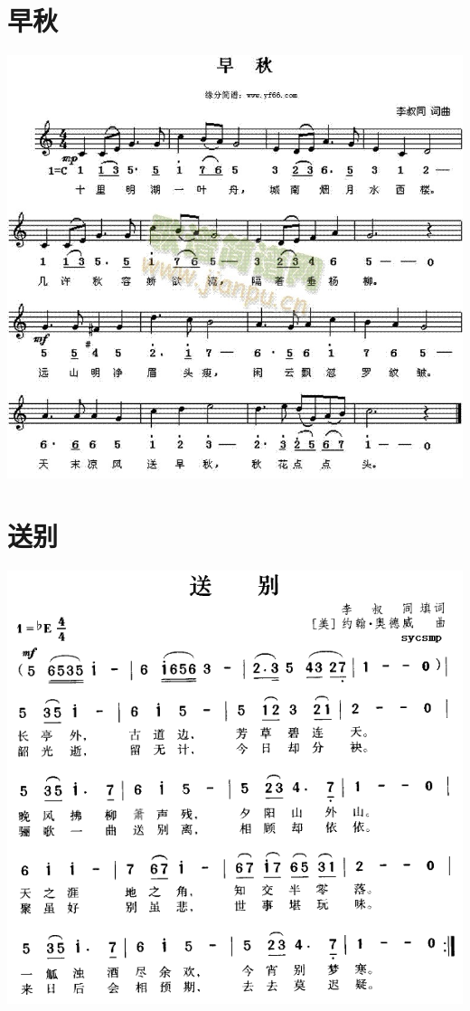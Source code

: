 \documentclass[cn,pad,twocol]{elegantbook}
\begin{document}
\section{早秋}      \includegraphics[width=\textwidth]{dongxiao/20200909-李叔同-早秋.jpg} 
\section{送别}      \includegraphics[width=\textwidth]{dongxiao/20200909-李叔同-送别.png} 
\end{document}
